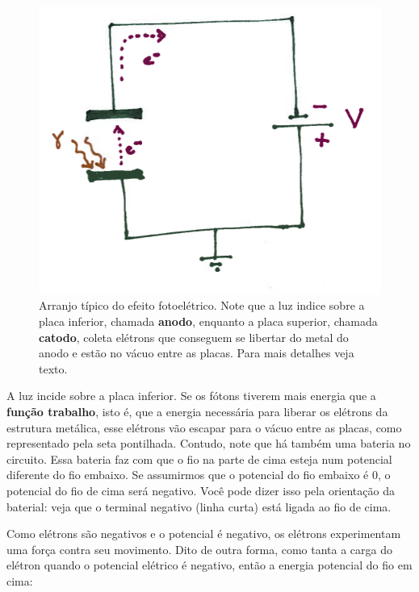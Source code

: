 \documentclass{article}
\begin{document}
\begin{figure}[h]
\centering
\includegraphics{circuito.png}
\caption{Arranjo t\'ipico do efeito fotoel\'etrico. Note que a luz indice sobre a placa inferior, chamada \textbf{anodo}, enquanto a placa superior, chamada \textbf{catodo}, coleta el\'etrons que conseguem se libertar do metal do anodo e est\~ao no v\'acuo entre as placas. Para mais detalhes veja texto.}
\end{figure}
A luz incide sobre a placa inferior. Se os f\'otons tiverem mais energia que a \textbf{fun\c c\~ao trabalho}, isto \'e, que a energia necess\'aria para liberar os el\'etrons da estrutura met\'alica, esse el\'etrons v\~ao escapar para o v\'acuo entre as placas, como representado pela seta pontilhada. Contudo, note que h\'a tamb\'em uma bateria no circuito. Essa bateria faz com que o fio na parte de cima esteja num potencial diferente do fio embaixo. Se assumirmos que o potencial do fio embaixo \'e 0, o potencial do fio de cima ser\'a negativo. Voc\^e pode dizer isso pela orienta\c c\~ao da baterial: veja que o terminal negativo (linha curta) est\'a ligada ao fio de cima.

Como el\'etrons s\~ao negativos e o potencial \'e negativo, os el\'etrons experimentam uma for\c ca contra seu movimento. Dito de outra forma, como tanta a carga do el\'etron quando o potencial el\'etrico \'e negativo, ent\~ao a energia potencial do fio em cima:
\end{document}
